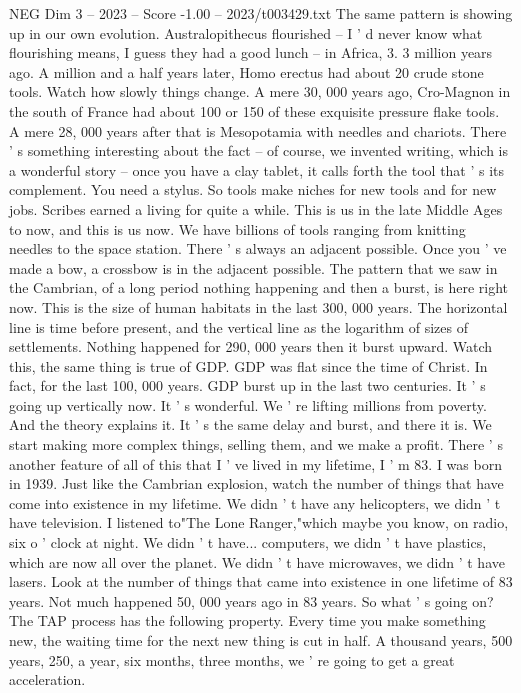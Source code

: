 \begin{textsample}{NEG Dim 3 – 2023 – Score -1.00 – 2023/t003429.txt}
The same pattern is showing up in our own evolution.
Australopithecus flourished -- I ' d never know what flourishing means, I guess they had a good lunch -- in Africa, 3. 3 million years ago.
A million and a half years later, Homo erectus had about 20 crude stone tools.
Watch how slowly things change.
A mere 30, 000 years ago, Cro-Magnon in the south of France had about 100 or 150 of these exquisite pressure flake tools.
A mere 28, 000 years after that is Mesopotamia with needles and chariots.
There ' s something interesting about the fact -- of course, we invented writing, which is a wonderful story -- once you have a clay tablet, it calls forth the tool that ' s its complement.
You need a stylus.
So tools make niches for new tools and for new jobs.
Scribes earned a living for quite a while.
This is us in the late Middle Ages to now, and this is us now.
We have billions of tools ranging from knitting needles to the space station.
There ' s always an adjacent possible.
Once you ' ve made a bow, a crossbow is in the adjacent possible.
The pattern that we saw in the Cambrian, of a long period nothing happening and then a burst, is here right now.
This is the size of human habitats in the last 300, 000 years.
The horizontal line is time before present, and the vertical line as the logarithm of sizes of settlements.
Nothing happened for 290, 000 years then it burst upward.
Watch this, the same thing is true of GDP.
GDP was flat since the time of Christ.
In fact, for the last 100, 000 years.
GDP burst up in the last two centuries.
It ' s going up vertically now.
It ' s wonderful.
We ' re lifting millions from poverty.
And the theory explains it.
It ' s the same delay and burst, and there it is.
We start making more complex things, selling them, and we make a profit.
There ' s another feature of all of this that I ' ve lived in my lifetime, I ' m 83.
I was born in 1939.
Just like the Cambrian explosion, watch the number of things that have come into existence in my lifetime.
We didn ' t have any helicopters, we didn ' t have television.
I listened to"The Lone Ranger,"which maybe you know, on radio, six o ' clock at night.
We didn ' t have... computers, we didn ' t have plastics, which are now all over the planet.
We didn ' t have microwaves, we didn ' t have lasers.
Look at the number of things that came into existence in one lifetime of 83 years.
Not much happened 50, 000 years ago in 83 years.
So what ' s going on?
The TAP process has the following property.
Every time you make something new, the waiting time for the next new thing is cut in half.
A thousand years, 500 years, 250, a year, six months, three months, we ' re going to get a great acceleration.

\end{textsample}
